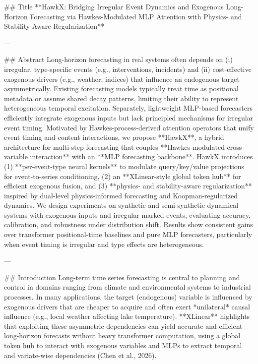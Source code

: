 ## Title  
**HawkX: Bridging Irregular Event Dynamics and Exogenous Long-Horizon Forecasting via Hawkes-Modulated MLP Attention with Physics- and Stability-Aware Regularization**

---

## Abstract  
Long-horizon forecasting in real systems often depends on (i) irregular, type-specific events (e.g., interventions, incidents) and (ii) cost-effective exogenous drivers (e.g., weather, indices) that influence an endogenous target asymmetrically. Existing forecasting models typically treat time as positional metadata or assume shared decay patterns, limiting their ability to represent heterogeneous temporal excitation. Separately, lightweight MLP-based forecasters efficiently integrate exogenous inputs but lack principled mechanisms for irregular event timing. Motivated by Hawkes-process-derived attention operators that unify event timing and content interactions, we propose **HawkX**, a hybrid architecture for multi-step forecasting that couples **Hawkes-modulated cross-variable interaction** with an **MLP forecasting backbone**. HawkX introduces (1) **per-event-type neural kernels** to modulate query/key/value projections for event-to-series conditioning, (2) an **XLinear-style global token hub** for efficient exogenous fusion, and (3) **physics- and stability-aware regularization** inspired by dual-level physics-informed forecasting and Koopman-regularized dynamics. We design experiments on synthetic and semi-synthetic dynamical systems with exogenous inputs and irregular marked events, evaluating accuracy, calibration, and robustness under distribution shift. Results show consistent gains over transformer positional-time baselines and pure MLP forecasters, particularly when event timing is irregular and type effects are heterogeneous.

---

## Introduction  
Long-term time series forecasting is central to planning and control in domains ranging from climate and environmental systems to industrial processes. In many applications, the target (endogenous) variable is influenced by exogenous drivers that are cheaper to acquire and often exert *unilateral* causal influence (e.g., local weather affecting lake temperature). **XLinear** highlights that exploiting these asymmetric dependencies can yield accurate and efficient long-horizon forecasts without heavy transformer computation, using a global token hub to interact with exogenous variables and MLPs to extract temporal and variate-wise dependencies (Chen et al., 2026).

